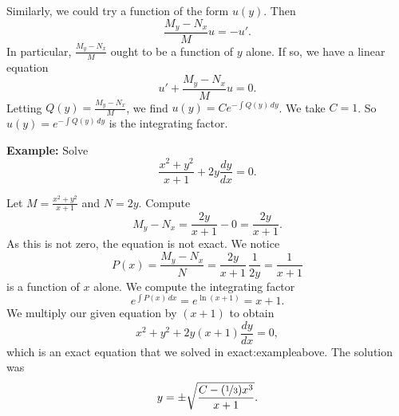 \documentclass[10pt,aspectratio=169]{beamer}
\begin{document}
\begin{frame}
Similarly, we could try a function of the form $u(y)$.
Then
\begin{equation*}
\frac{M_y-N_x}{M} u = - u' .
\end{equation*}
In particular, $\frac{M_y-N_x}{M}$ ought to be a function of $y$ alone.
If so, we have a linear equation
\begin{equation*}
u' + \frac{M_y-N_x}{M} u = 0 .
\end{equation*}
Letting $Q(y) = \frac{M_y-N_x}{M}$,
we find $u(y) = C e^{-\int Q(y) \, dy}$.  We
take $C=1$.  So $u(y) = e^{-\int Q(y) \, dy}$ is the integrating factor.

\end{frame}

\begin{frame}

\textbf{Example:}
Solve
\begin{equation*}
\frac{x^2+y^2}{x+1} + 2y \frac{dy}{dx} = 0 .
\end{equation*}

Let $M= \frac{x^2+y^2}{x+1}$ and $N=2y$.
Compute
\begin{equation*}
M_y-N_x = \frac{2y}{x+1} - 0 = \frac{2y}{x+1} .
\end{equation*}
As this is not zero, the equation is not exact.  We notice 
\begin{equation*}
P(x) = \frac{M_y-N_x}{N} = \frac{2y}{x+1} \, \frac{1}{2y} = \frac{1}{x+1} 
\end{equation*}
is a function of $x$ alone.    We compute the integrating factor
\begin{equation*}
e^{\int  P(x) \, dx}
=
e^{\ln (x+1)} = x+1 .
\end{equation*}
We multiply our given equation by $(x+1)$ to obtain
\begin{equation*}
x^2+y^2 + 2y(x+1) \frac{dy}{dx} = 0 ,
\end{equation*}
which is an exact equation that we solved in
{exact:exampleabove}.  The solution was
\begin{equation*}
y = \pm \sqrt{\frac{C-(\nicefrac{1}{3})x^3}{x+1}} .
\end{equation*}
\end{frame}
\end{document}
